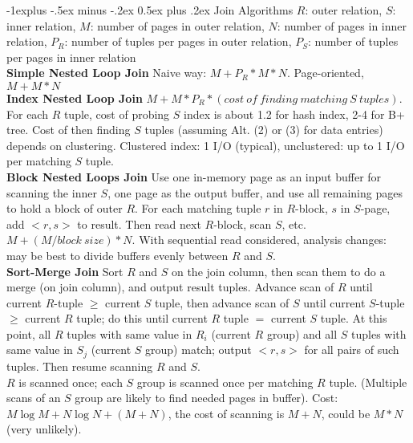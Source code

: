 \documentclass[10pt,landscape]{article}
\makeatletter
\renewcommand{\subsection}{\@startsection{subsection}{2}{0mm}%
                                {-1explus -.5ex minus -.2ex}%
                                {0.5ex plus .2ex}%
                                {\normalfont\normalsize\bfseries}}
\makeatother
\begin{document}
\raggedright
\footnotesize
\begin{multicols}{3}


\setlength{\premulticols}{1pt}
\setlength{\postmulticols}{1pt}
\setlength{\multicolsep}{1pt}
\setlength{\columnsep}{2pt}

\subsection{Join Algorithms}
$R$: outer relation, $S$: inner relation, $M$: number of pages in outer relation, $N$: number of pages in inner relation, ${P}_{R}$: number of tuples per pages in outer relation, ${P}_{S}$: number of tuples per pages in inner relation \\
{\bf Simple Nested Loop Join} Naive way: $M + {P}_{R}*M*N$. Page-oriented, $M + M*N$ \\
{\bf Index Nested Loop Join} $M + M*P_{R}*(cost\ of\ finding\ matching\ S\ tuples)$. For each $R$ tuple, cost of probing $S$ index is about 1.2 for hash index, 2-4 for B+ tree. Cost of then finding $S$ tuples (assuming Alt. (2) or (3) for data entries) depends on clustering. Clustered index: 1 I/O (typical), unclustered: up to 1 I/O per matching $S$ tuple. \\
{\bf Block Nested Loops Join} Use one in-memory page as an input buffer for scanning the inner $S$, one page as the output buffer, and use all remaining pages to hold a block of outer $R$. For each matching tuple $r$ in $R$-block, $s$ in $S$-page, add $<r, s>$ to result. Then read next $R$-block, scan $S$, etc. $M + (M/block\ size) * N$.  With sequential read considered, analysis changes: may be best to divide buffers evenly between $R$ and $S$.\\
{\bf Sort-Merge Join} Sort $R$ and $S$ on the join column, then scan them to do a merge (on join column), and output result tuples. Advance scan of $R$ until current $R$-tuple $\geq$ current $S$ tuple, then advance scan of $S$ until current $S$-tuple $\geq$ current $R$ tuple; do this until current $R$ tuple $=$ current $S$ tuple. At this point, all $R$ tuples with same value in $R_i$ (current $R$ group) and all $S$ tuples with same value in $S_j$ (current $S$ group) match; output $<r, s>$ for all pairs of such tuples. Then resume scanning $R$ and $S$. \\
$R$ is scanned once; each $S$ group is scanned once per matching $R$ tuple. (Multiple scans of an $S$ group are likely to find needed pages in buffer). Cost: $M \log{M} + N\log{N} + (M+N)$, the cost of scanning is $M+N$, could be $M*N$ (very unlikely). \\

\end{multicols}
\end{document}
